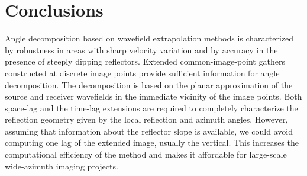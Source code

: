\section{Conclusions}

Angle decomposition based on wavefield extrapolation methods is
characterized by robustness in areas with sharp velocity variation and
by accuracy in the presence of steeply dipping reflectors. 
Extended common-image-point gathers constructed at discrete image
points provide sufficient information for angle decomposition. The
decomposition is based on the planar approximation of the source and
receiver wavefields in the immediate vicinity of the image
points. 
Both space-lag and the time-lag extensions are required to completely
characterize the reflection geometry given by the local reflection and
azimuth angles. However, assuming that information about the reflector
slope is available, we could avoid computing one lag of the extended
image, usually the vertical. This increases the computational
efficiency of the method and makes it affordable for large-scale
wide-azimuth imaging projects.

